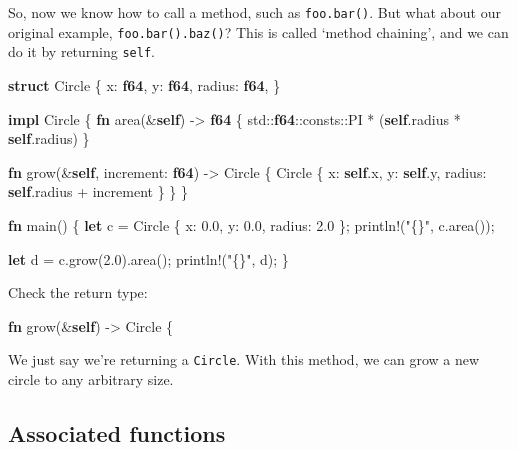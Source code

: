 \documentclass[a4paper,]{book}
\newenvironment{Shaded}{\begin{snugshade}}{\end{snugshade}}
\newcommand{\KeywordTok}[1]{\textcolor[rgb]{0.13,0.29,0.53}{\textbf{{#1}}}}
\newcommand{\DecValTok}[1]{\textcolor[rgb]{0.00,0.00,0.81}{{#1}}}
\newcommand{\StringTok}[1]{\textcolor[rgb]{0.31,0.60,0.02}{{#1}}}
\newcommand{\OtherTok}[1]{\textcolor[rgb]{0.56,0.35,0.01}{{#1}}}
\newcommand{\NormalTok}[1]{{#1}}
\begin{document}
So, now we know how to call a method, such as \texttt{foo.bar()}. But
what about our original example, \texttt{foo.bar().baz()}? This is
called `method chaining', and we can do it by returning \texttt{self}.

\begin{Shaded}
\begin{Highlighting}[]
\KeywordTok{struct} \NormalTok{Circle \{}
    \NormalTok{x: }\KeywordTok{f64}\NormalTok{,}
    \NormalTok{y: }\KeywordTok{f64}\NormalTok{,}
    \NormalTok{radius: }\KeywordTok{f64}\NormalTok{,}
\NormalTok{\}}

\KeywordTok{impl} \NormalTok{Circle \{}
    \KeywordTok{fn} \NormalTok{area(&}\KeywordTok{self}\NormalTok{) -> }\KeywordTok{f64} \NormalTok{\{}
        \NormalTok{std::}\KeywordTok{f64}\NormalTok{::consts::PI * (}\KeywordTok{self}\NormalTok{.radius * }\KeywordTok{self}\NormalTok{.radius)}
    \NormalTok{\}}

    \KeywordTok{fn} \NormalTok{grow(&}\KeywordTok{self}\NormalTok{, increment: }\KeywordTok{f64}\NormalTok{) -> Circle \{}
        \NormalTok{Circle \{ x: }\KeywordTok{self}\NormalTok{.x, y: }\KeywordTok{self}\NormalTok{.y, radius: }\KeywordTok{self}\NormalTok{.radius + increment \}}
    \NormalTok{\}}
\NormalTok{\}}

\KeywordTok{fn} \NormalTok{main() \{}
    \KeywordTok{let} \NormalTok{c = Circle \{ x: }\DecValTok{0.0}\NormalTok{, y: }\DecValTok{0.0}\NormalTok{, radius: }\DecValTok{2.0} \NormalTok{\};}
    \OtherTok{println!}\NormalTok{(}\StringTok{"\{\}"}\NormalTok{, c.area());}

    \KeywordTok{let} \NormalTok{d = c.grow(}\DecValTok{2.0}\NormalTok{).area();}
    \OtherTok{println!}\NormalTok{(}\StringTok{"\{\}"}\NormalTok{, d);}
\NormalTok{\}}
\end{Highlighting}
\end{Shaded}

Check the return type:

\begin{Shaded}
\begin{Highlighting}[]
\KeywordTok{fn} \NormalTok{grow(&}\KeywordTok{self}\NormalTok{) -> Circle \{}
\end{Highlighting}
\end{Shaded}

We just say we're returning a \texttt{Circle}. With this method, we can
grow a new circle to any arbitrary size.

\subsection{Associated functions}\label{associated-functions}
\end{document}
